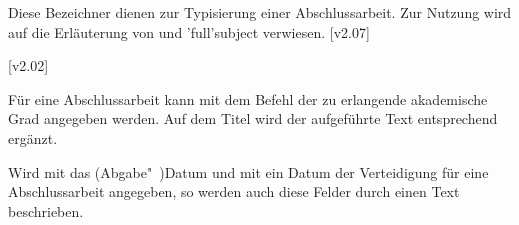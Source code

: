 \begin{DeclareEntity*}{}
\begin{DeclareEntity*}{}
\begin{DeclareEntity*}{}
\begin{Declaration}
\begin{Declaration}
\begin{Declaration}
\begin{Declaration}
\begin{Declaration}
\begin{Declaration}
\begin{Declaration}
\begin{Declaration}
\begin{Declaration}
\begin{Declaration}
\begin{Declaration}
\begin{Declaration}
\begin{Declaration}
Diese Bezeichner dienen zur Typisierung einer Abschlussarbeit. Zur Nutzung wird 
auf die Erläuterung von  und \Macro*'full'{subject} verwiesen.
[v2.07]
\end{Declaration}
\end{Declaration}
\end{Declaration}
\end{Declaration}
\end{Declaration}
\end{Declaration}
\end{Declaration}
\end{Declaration}
\end{Declaration}
\end{Declaration}
\end{Declaration}
\end{Declaration}
\end{Declaration}

\begin{Declaration}
  {}
  [v2.02]

Für eine Abschlussarbeit kann mit dem Befehl  der zu 
erlangende akademische Grad angegeben werden. Auf dem Titel wird der 
aufgeführte Text entsprechend ergänzt.
%
\end{Declaration}

\begin{Declaration}
  {}
\begin{Declaration}
  {}

Wird mit  das (Abgabe"~)Datum und mit  ein Datum 
der Verteidigung für eine Abschlussarbeit angegeben, so werden auch diese 
Felder durch einen Text beschrieben.
%
\end{Declaration}
\end{Declaration}
%


\end{DeclareEntity*}
\end{DeclareEntity*}
\end{DeclareEntity*}
